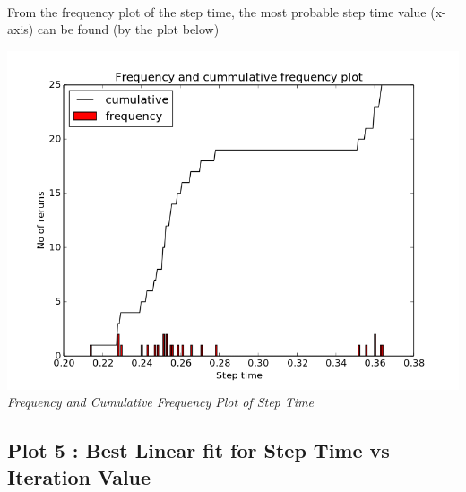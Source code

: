 \documentclass[11pt]{article}
\begin{document}
\paragraph{}

From the frequency plot of the step time, the most probable step time value (x-axis) 
can be found (by the plot below)
\begin{center}
 \includegraphics[scale = 0.4]{images/plots/plot04} \\
  \emph{Frequency and Cumulative Frequency Plot of Step Time} \\
\end{center}

\subsection{Plot 5 : Best Linear fit for Step Time vs Iteration Value}
\end{document}
